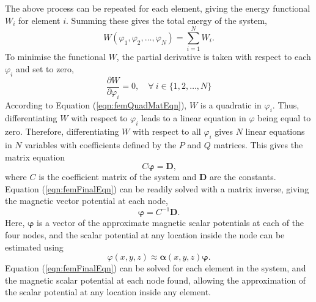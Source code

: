 The above process can be repeated for each element, giving the energy functional \(W_i\) for element \(i\). Summing these gives the total energy of the system,
\begin{equation}
    W\left(\varphi_1,\varphi_2,\dots,\varphi_N\right) = \sum_{i = 1}^N W_i \text{.}
\end{equation}
To minimise the functional \(W\)\hspace{-1mm}, the partial derivative is taken with respect to each \(\varphi_i\) and set to zero,
\begin{equation}
    \frac{\partial W}{\partial \varphi_i} = 0, \quad \forall\ i \in \{1,2,\dots,N\}
\end{equation}
According to Equation (\ref{eqn:femQuadMatEqn}), \(W\) is a quadratic in \(\varphi_i\). Thus, differentiating \(W\) with respect to \(\varphi_i\) leads to a linear equation in \(\varphi\) being equal to zero. Therefore, differentiating \(W\) with respect to all \(\varphi_i\) gives \(N\) linear equations in \(N\) variables with coefficients defined by the \(P\) and \(Q\) matrices. This gives the matrix equation
\begin{equation}\label{eqn:femFinalEqn}
    C \bm{\varphi} = \mathbf{D} \text{,}
\end{equation}
where \(C\) is the coefficient matrix of the system and \(\mathbf{D}\) are the constants. Equation (\ref{eqn:femFinalEqn}) can be readily solved with a matrix inverse, giving the magnetic vector potential at each node,
\begin{equation}
    \bm{\varphi} = C^{-1}\mathbf{D} \text{.}
\end{equation}
Here, \(\bm{\varphi}\) is a vector of the approximate magnetic scalar potentials at each of the four nodes, and the scalar potential at any location inside the node can be estimated using
\begin{equation}
    \varphi \left(x,y,z\right) \approx \bm{\alpha} \left(x,y,z\right) \bm{\varphi} \text{.}
\end{equation}
Equation (\ref{eqn:femFinalEqn}) can be solved for each element in the system, and the magnetic scalar potential at each node found, allowing the approximation of the scalar potential at any location inside any element.

